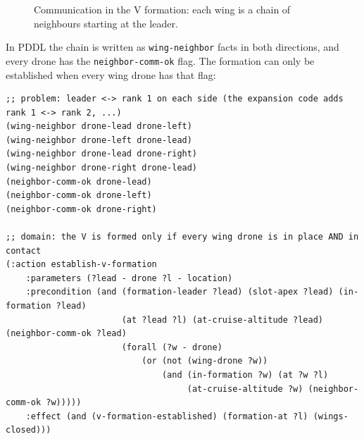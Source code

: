 \documentclass[11pt,a4paper,oneside]{report}
\newcommand{\code}[1]{\texttt{#1}}
\begin{document}
\begin{figure}[H]
\centering
{}
\caption[Communication in the V formation]{Communication in the V formation: each wing is a
chain of neighbours starting at the leader.}
\label{fig:comm-v}
\end{figure}

\noindent In PDDL the chain is written as \code{wing-neighbor} facts in both directions, and
every drone has the \code{neighbor-comm-ok} flag. The formation can only be established when
every wing drone has that flag:

\begin{lstlisting}
;; problem: leader <-> rank 1 on each side (the expansion code adds rank 1 <-> rank 2, ...)
(wing-neighbor drone-lead drone-left)
(wing-neighbor drone-left drone-lead)
(wing-neighbor drone-lead drone-right)
(wing-neighbor drone-right drone-lead)
(neighbor-comm-ok drone-lead)
(neighbor-comm-ok drone-left)
(neighbor-comm-ok drone-right)

;; domain: the V is formed only if every wing drone is in place AND in contact
(:action establish-v-formation
    :parameters (?lead - drone ?l - location)
    :precondition (and (formation-leader ?lead) (slot-apex ?lead) (in-formation ?lead)
                       (at ?lead ?l) (at-cruise-altitude ?lead) (neighbor-comm-ok ?lead)
                       (forall (?w - drone)
                           (or (not (wing-drone ?w))
                               (and (in-formation ?w) (at ?w ?l)
                                    (at-cruise-altitude ?w) (neighbor-comm-ok ?w)))))
    :effect (and (v-formation-established) (formation-at ?l) (wings-closed)))
\end{lstlisting}
\end{document}
